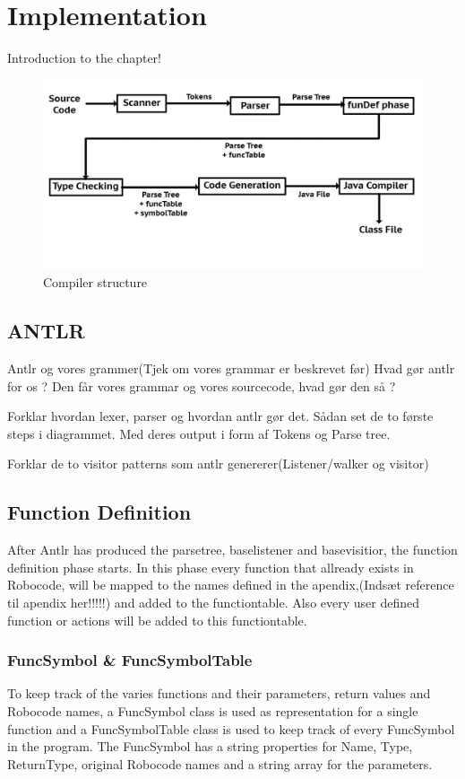 \chapter{Implementation}
Introduction to the chapter!

\begin{figure}[!ht]
\centering
\includegraphics[scale=0.35]{billeder/compilerStructure}
\caption{Compiler structure}
\label{cs}
\end{figure}


\section{ANTLR}
Antlr og vores grammer(Tjek om vores grammar er beskrevet før)
Hvad gør antlr for os ?
Den får vores grammar og vores sourcecode, hvad gør den så ?


Forklar hvordan lexer, parser og hvordan antlr gør det. Sådan set de to første steps i diagrammet. Med deres output i form af Tokens og Parse tree.

Forklar de to visitor patterns som antlr genererer(Listener/walker og visitor)
\section{Function Definition}
After Antlr has produced the parsetree, baselistener and basevisitior, the function definition phase starts. In this phase every function that allready exists in Robocode, will be mapped to the names defined in the apendix,(Indsæt reference til apendix her!!!!!) and added to the functiontable. Also every user defined function or actions will be added to this functiontable. 

\subsection{FuncSymbol \& FuncSymbolTable}
To keep track of the varies functions and their parameters, return values and Robocode names, a FuncSymbol class is used as representation for a single function and a FuncSymbolTable class is used to keep track of every FuncSymbol in the program.
The FuncSymbol has a string properties for Name, Type, ReturnType, original Robocode names and a string array for the parameters.

